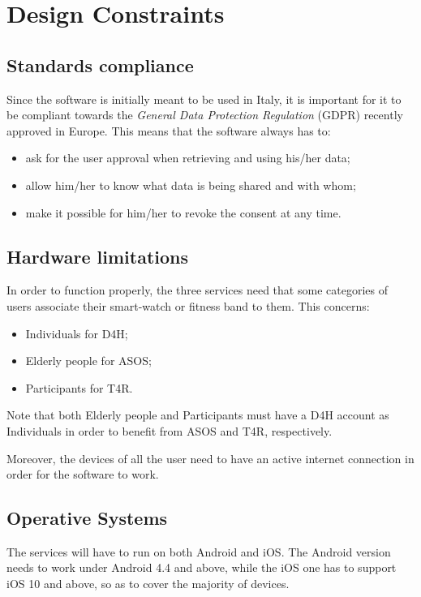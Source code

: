 \section{Design Constraints}
    \subsection{Standards compliance}
        
        Since the software is initially meant to be used in Italy, it is important for it to be compliant towards the \emph{General Data Protection Regulation} (GDPR) recently approved in Europe. This means that the software always has to:
        \begin{itemize}
            \item ask for the user approval when retrieving and using his/her data;
            \item allow him/her to know what data is being shared and with whom;
            \item make it possible for him/her to revoke the consent at any time.
        \end{itemize}
        
    \subsection{Hardware limitations}
    
        In order to function properly, the three services need that some categories of users associate their smart-watch or fitness band to them. This concerns:
        \begin{itemize}
            \item Individuals for D4H;
            \item Elderly people for ASOS;
            \item Participants for T4R.
        \end{itemize}
        Note that both Elderly people and Participants must have a D4H account as Individuals in order to benefit from ASOS and T4R, respectively.
        
        Moreover, the devices of all the user need to have an active internet connection in order for the software to work.
        
    \subsection{Operative Systems}  \label{OS}
        
        The services will have to run on both Android and iOS. The Android version needs to work under Android 4.4 and above, while the iOS one has to support iOS 10 and above, so as to cover the majority of devices.